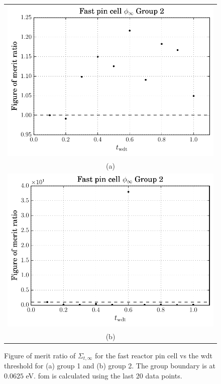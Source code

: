 \begin{figure}[hbtp]
  \centering
  \begin{tabular}{c}
  \includegraphics[scale=0.9]{images/results/fast_inf_tot_grp_1} \\
    (a) \\
  \includegraphics[scale=0.9]{images/results/fast_inf_tot_grp_2} \\
    (b) 
  \end{tabular}
  \caption[Figure of merit ratio of the $\Sigma_{t,\infty}$ for the
  fast reactor pin cell]{Figure of merit ratio of
    $\Sigma_{t,\infty}$ for the fast reactor pin cell vs the \gls{wdt}
    threshold for (a) group 1 and (b) group 2. The group
    boundary is at $0.0625$ eV. \gls{fom} is calculated using the last
    20 data points.}
  \label{fig:fast_inf_tot}
\end{figure}
